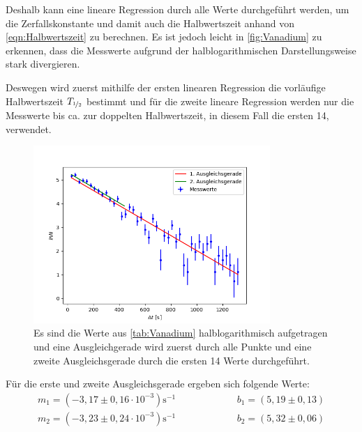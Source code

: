         Deshalb kann eine lineare Regression durch alle Werte durchgeführt werden, um die Zerfallskonstante und damit auch die Halbwertszeit anhand von \autoref{eqn:Halbwertszeit} zu berechnen.
        Es ist jedoch leicht in \autoref{fig:Vanadium} zu erkennen, dass die Messwerte aufgrund der halblogarithmischen Darstellungsweise stark divergieren.

        Deswegen wird zuerst mithilfe der ersten linearen Regression die vorläufige Halbwertszeit $T_{\nicefrac{1}{2}}$ bestimmt und für die zweite lineare Regression werden nur die Messwerte bis ca. zur doppelten Halbwertszeit, in diesem Fall die ersten 14, verwendet.

        \begin{figure}[h]
            \centering
            \includegraphics[width = 0.8\textwidth]{pictures/HalbwertszeitGraph_Vanadium.png}
            \caption{Es sind die Werte aus \autoref{tab:Vanadium} halblogarithmisch aufgetragen und eine Ausgleichgerade wird zuerst durch alle Punkte und eine zweite Ausgleichsgerade durch die ersten 14 Werte durchgeführt.}
            \label{fig:Vanadium}
        \end{figure}

        \FloatBarrier

        Für die erste und zweite Ausgleichsgerade ergeben sich folgende Werte:
        \begin{align*}
            m_1 = (-3,17 \pm 0,16 \cdot 10^{-3}) \text{s}^{-1} \hspace{75pt} b_1 = (5,19 \pm 0,13) \\
            m_2 = (-3,23 \pm 0,24 \cdot 10^{-3}) \text{s}^{-1} \hspace{75pt} b_2 = (5,32 \pm 0,06)
        \end{align*}

